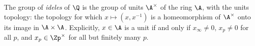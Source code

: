 The group of \emph{ideles} of $\Q$ is the group of units $\A^\times$ of the ring $\A$, with the units topology: the
topology for which $x\mapsto(x,x^{-1})$ is a homeomorphism of $\A^\times$ onto its image in $\A\times\A$.
Explicitly, $x\in\A$ is a unit if and only if $x_\infty\neq0$, $x_p\neq0$ for all $p$, and $x_p\in\Zp^\times$ for all
but finitely many $p$.
